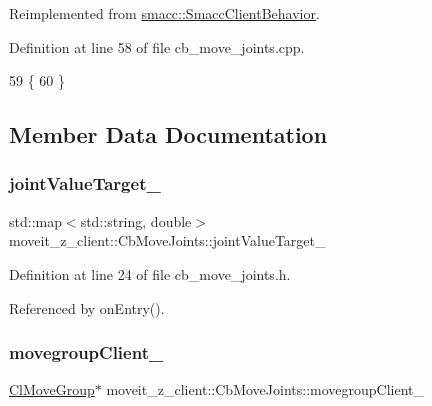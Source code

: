 Reimplemented from \hyperlink{classsmacc_1_1SmaccClientBehavior_ac0cd72d42bd00425362a97c9803ecce5}{smacc\+::\+Smacc\+Client\+Behavior}.



Definition at line 58 of file cb\+\_\+move\+\_\+joints.\+cpp.


\begin{DoxyCode}
59 \{
60 \}
\end{DoxyCode}


\subsection{Member Data Documentation}
\mbox{\label{classmoveit__z__client_1_1CbMoveJoints_a0f52577dd2fccf25f36c4c93e733c0f4}} 
\subsubsection{\texorpdfstring{joint\+Value\+Target\+\_\+}{jointValueTarget\_}}
{\footnotesize\ttfamily std\+::map$<$std\+::string, double$>$ moveit\+\_\+z\+\_\+client\+::\+Cb\+Move\+Joints\+::joint\+Value\+Target\+\_\+}



Definition at line 24 of file cb\+\_\+move\+\_\+joints.\+h.



Referenced by on\+Entry().

\mbox{\label{classmoveit__z__client_1_1CbMoveJoints_a2ce2e613b676025766dcd2f01ae50810}} 
\subsubsection{\texorpdfstring{movegroup\+Client\+\_\+}{movegroupClient\_}}
{\footnotesize\ttfamily \hyperlink{classmoveit__z__client_1_1ClMoveGroup}{Cl\+Move\+Group}$\ast$ moveit\+\_\+z\+\_\+client\+::\+Cb\+Move\+Joints\+::movegroup\+Client\+\_\+\hspace{0.3cm}{\ttfamily [protected]}}



